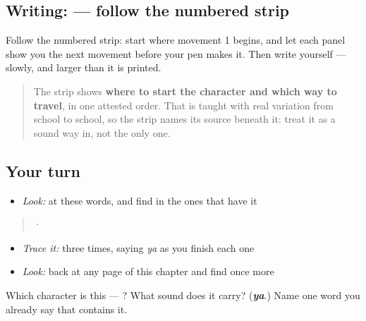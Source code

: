 \subsection*{Writing:  — follow the numbered strip}

Follow the numbered strip: start where movement 1 begins, and let each panel show you the next movement before your pen makes it. Then write  yourself — slowly, and larger than it is printed.

\begin{quote}
The strip shows \textbf{where to start the character and which way to travel}, in one attested order. That is taught with real variation from school to school, so the strip names its source beneath it: treat it as a sound way in, not the only one.
\end{quote}

\subsection*{Your turn}
\begin{itemize}
\raggedright
  \item \emph{Look:} at these words, and find  in the ones that have it
\end{itemize}

\begin{quote}
  ·  
\end{quote}

\begin{itemize}
\raggedright
  \item \emph{Trace it:}  three times, saying \emph{ya} as you finish each one
  \item \emph{Look:} back at any page of this chapter and find  once more
\end{itemize}

\begin{tcolorbox}[breakable,colback=teal!4,colframe=teal!35!black,title={Before you move on}]
Which character is this — ? What sound does it carry? (\emph{\textbf{ya}}.) Name one word you already say that contains it.
\end{tcolorbox}

